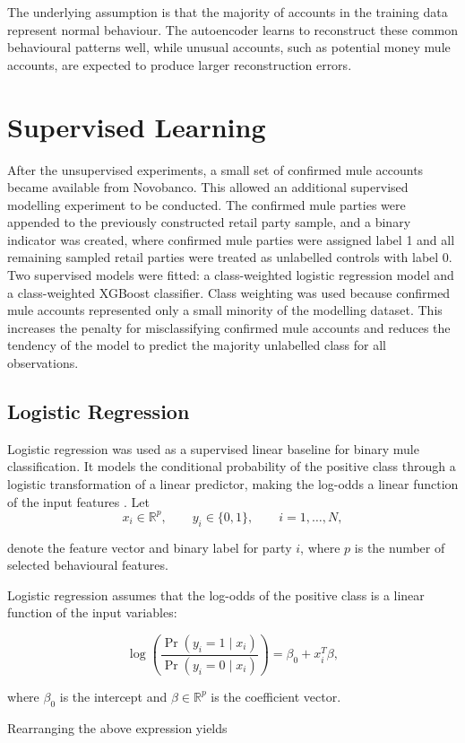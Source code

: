 The underlying assumption is that the majority of accounts in the training data
represent normal behaviour. The autoencoder learns to reconstruct these common
behavioural patterns well, while unusual accounts, such as potential money mule
accounts, are expected to produce larger reconstruction errors.
\section{Supervised Learning}
After the unsupervised experiments, a small set of confirmed mule accounts became available from Novobanco. This allowed an additional supervised modelling experiment to be conducted. The confirmed mule parties were appended to the previously constructed retail party sample, and a binary indicator was created, where confirmed mule parties were assigned label 1 and all remaining sampled retail parties were treated as unlabelled controls with label 0.
Two supervised models were fitted: a class-weighted logistic regression model and a class-weighted XGBoost classifier. Class weighting was used because confirmed mule accounts represented only a small minority of the modelling dataset. This increases the penalty for misclassifying confirmed mule accounts and reduces the tendency of the model to predict the majority unlabelled class for all observations.
\subsection{Logistic Regression}
Logistic regression was used as a supervised linear baseline for binary mule classification. 
It models the conditional probability of the positive class through a logistic transformation 
of a linear predictor, making the log-odds a linear function of the input features 
\citep{cox1958regression}.
Let
\[
x_i \in \mathbb{R}^{p},
\qquad
y_i \in \{0,1\},
\qquad
i=1,\ldots,N,
\]

denote the feature vector and binary label for party \(i\), where \(p\) is the number
of selected behavioural features.

Logistic regression assumes that the log-odds of the positive class is a linear
function of the input variables:

\[
\log
\left(
\frac{\Pr(y_i=1 \mid x_i)}
{\Pr(y_i=0 \mid x_i)}
\right)
=
\beta_0 + x_i^{T}\beta,
\]

where \(\beta_0\) is the intercept and
\(\beta \in \mathbb{R}^{p}\) is the coefficient vector.

Rearranging the above expression yields

